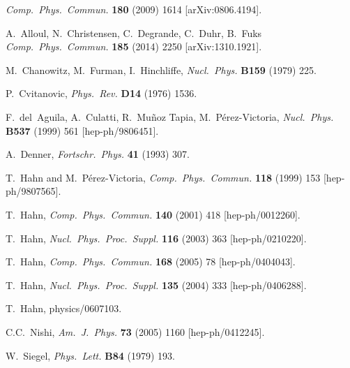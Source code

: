 \documentclass[twoside,11pt]{article}
\begin{document}
\begin{flushleft}
\begin{thebibliography}{999}

\newcommand{\acm}[3]{\textsl{ACM Trans.\ Math.\ Software} \textbf{#1} (#2) #3}
\newcommand{\ajp}[3]{\textsl{Am.\ J.\ Phys.} \textbf{#1} (#2) #3}
\newcommand{\app}[3]{\textsl{Acta Phys.\ Polon.} \textbf{#1} (#2) #3}
\newcommand{\cpc}[3]{\textsl{Comp.\ Phys.\ Commun.} \textbf{#1} (#2) #3}
\newcommand{\fp}[3]{\textsl{Fortschr.\ Phys.} \textbf{#1} (#2) #3}
\newcommand{\np}[3]{\textsl{Nucl.\ Phys.} \textbf{#1} (#2) #3}
\newcommand{\npps}[3]{\textsl{Nucl.\ Phys.\ Proc.\ Suppl.} \textbf{#1} (#2) #3}
\newcommand{\pl}[3]{\textsl{Phys.\ Lett.} \textbf{#1} (#2) #3}
\newcommand{\pr}[3]{\textsl{Phys.\ Rev.} \textbf{#1} (#2) #3}
\newcommand{\prl}[3]{\textsl{Phys.\ Rev.\ Lett.} \textbf{#1} (#2) #3}
\newcommand{\zp}[3]{\textsl{Z.\ Phys.} \textbf{#1} (#2) #3}

\cpc{180}{2009}{1614} [arXiv:0806.4194].

A.~Alloul, N.~Christensen, C.~Degrande, C.~Duhr, B.~Fuks
\cpc{185}{2014}{2250} [arXiv:1310.1921].

M.~Chanowitz, M.~Furman, I.~Hinchliffe, \np{B159}{1979}{225}.

P.~Cvitanovic, \pr{D14}{1976}{1536}.

F.~del~Aguila, A.~Culatti, R.~Mu\~noz Tapia, M.~P\'erez-Victoria,
\np{B537}{1999}{561} [hep-ph/9806451].

A.~Denner, \fp{41}{1993}{307}.

T.~Hahn and M.~P\'erez-Victoria, \cpc{118}{1999}{153} [hep-ph/9807565].

T.~Hahn, \cpc{140}{2001}{418} [hep-ph/0012260].

T.~Hahn, \npps{116}{2003}{363} [hep-ph/0210220].

T.~Hahn, \cpc{168}{2005}{78} [hep-ph/0404043].

T.~Hahn, \npps{135}{2004}{333} [hep-ph/0406288].

T.~Hahn, physics/0607103.

C.C.~Nishi, \ajp{73}{2005}{1160} [hep-ph/0412245].

W.~Siegel, \pl{B84}{1979}{193}.


\end{thebibliography}
\end{flushleft}
\end{document}
